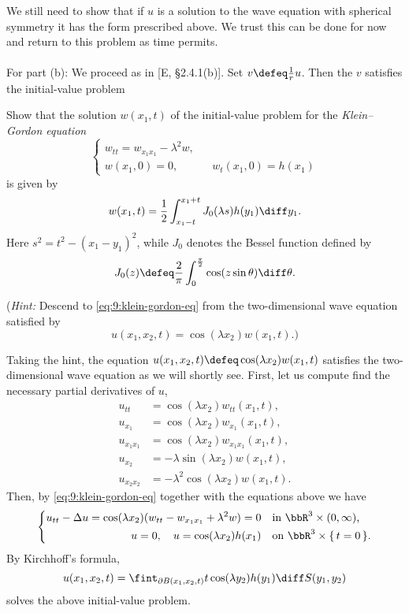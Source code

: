\begin{solution}
  We still need to show that if \(u\) is a solution to the wave equation
  with spherical symmetry it has the form prescribed above. We trust this
  can be done for now and return to this problem as time permits.
  \\\\
  For part (b): We proceed as in [E, \S 2.4.1(b)]. Set
  \(v\defeq \frac{1}{r}u\). Then the \(v\) satisfies the initial-value
  problem
\end{solution}
\newpage

\begin{problem}
  Show that the solution \(w(x_1,t)\) of the initial-value problem for the
  \emph{Klein--Gordon equation}
  \begin{equation}
    \label{eq:9:klein-gordon-eq}
    \left\{
      \begin{aligned}
        w_{tt}=w_{x_1x_1}-\lambda^2w,\\
        w(x_1,0)=0,&&w_t(x_1,0)=h(x_1)
      \end{aligned}
    \right.
  \end{equation}
  is given by
  \[
    w(x_1,t)=\frac{1}{2}\int_{x_1-t}^{x_1+t}J_0(\lambda s) h(y_1)\diff y_1.
  \]
  Here \(s^2=t^2-(x_1-y_1)^2\), while \(J_0\) denotes the Bessel function
  defined by
  \[
    J_0(z)\defeq \frac{2}{\pi}\int_0^{\frac{\pi}{2}}\cos(z\sin\theta)\diff\theta.
  \]

  \noindent (\emph{Hint:} Descend to \eqref{eq:9:klein-gordon-eq} from the
  two-dimensional wave equation satisfied by
  \[
    u(x_1,x_2,t)=\cos(\lambda x_2)w(x_1,t).\text{)}
  \]
\end{problem}
\begin{solution}
  Taking the hint, the equation \(u(x_1,x_2,t)\defeq\cos(\lambda
  x_2)w(x_1,t)\) satisfies the two-dimensional wave equation as we will
  shortly see. First, let us compute find the necessary partial derivatives
  of \(u\),
  \begin{align*}
    u_{tt}&=\cos(\lambda x_2)w_{tt}(x_1,t),\\
    u_{x_1}&=\cos(\lambda x_2)w_{x_1}(x_1,t),\\
    u_{x_1x_1}&=\cos(\lambda x_2)w_{x_1x_1}(x_1,t),\\
    u_{x_2}&=-\lambda\sin(\lambda x_2)w(x_1,t),\\
    u_{x_2x_2}&=-\lambda^2\cos(\lambda x_2)w(x_1,t).
  \end{align*}
  Then, by \eqref{eq:9:klein-gordon-eq} together with the equations above
  we have
  \[
    \left\{
      \begin{aligned}
        u_{tt}-\Delta u=\cos(\lambda x_2)(w_{tt}-w_{x_1x_1}+\lambda^2 w)=0
        &&&\text{in \(\bbR^3\times(0,\infty)\),}\\
        u=0,\quad u=\cos(\lambda x_2)h(x_1)&&&\text{on
          \(\bbR^3\times\{\,t=0\,\}\).}
      \end{aligned}
    \right.
  \]
  By Kirchhoff's formula,
  \[
    u(x_1,x_2,t)=\fint_{\partial
      B(x_1,x_2,t)}t\cos(\lambda y_2)h(y_1)\diff S(y_1,y_2)
  \]
  solves the above initial-value problem.
\end{solution}
\newpage

